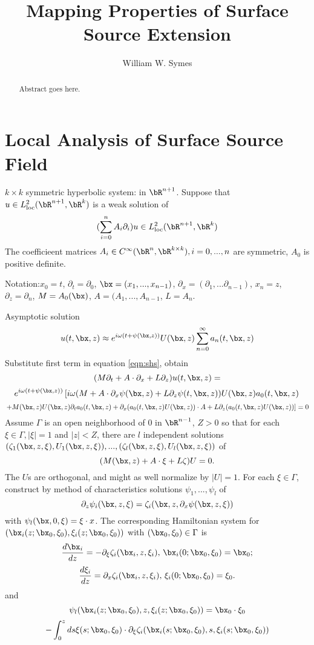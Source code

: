 \title{Mapping Properties of Surface Source Extension}
\author{William W. Symes}

\begin{abstract}
  Abstract goes here.
\end{abstract}

\section{Local Analysis of Surface Source Field}
$k \times  k$ symmetric hyperbolic system: in $\bR^{n+1}$. Suppose that $u \in L^2_{\rm loc}(\bR^{n+1},\bR^k)$ is a weak solution of
\begin{equation}
  \label{eqn:shs}
  (\sum_{i=0}^n A_i\partial_i ) u \in L^2_{\rm loc}(\bR^{n+1},\bR^k)
\end{equation}
The coefficieent matrices $A_i \in C^{\infty}(\bR^n, \bR^{k \times
  k}), i=0,...,n$ are symmetric, $A_0$ is positive definite.

Notation:$x_0=t$, $\partial_t=\partial_0$, $\bx = (x_1,...,x_{n-1})$,
$\partial_x=(\partial_1,...\partial_{n-1})$, $x_n=z$, $\partial_z =
\partial_{n}$, $M=A_0(\bx)$, $A = (A_1,...,A_{n-1}$, $L=A_{n}$.

Asymptotic solution 
\[
u(t,\bx,z) \approx e^{i\omega(t + \psi(\bx,z))} U(\bx,z)\sum_{n=0}^{\infty}
a_n(t,\bx,z)
\]
Substitute first term in equation \ref{eqn:shs}, obtain
\[
(M\partial_t + A\cdot \partial_x + L \partial_z)u(t,\bx,z) =
\]
\[
 e^{i\omega(t + \psi(\bx,z))}\left[ i\omega (M + A
\cdot \partial_x \psi(\bx,z) + L \partial_z
\psi(t,\bx,z))U(\bx,z)a_0(t,\bx,z) \right.
\]
\[
\left. + M(\bx,z) U(\bx,z) \partial_t a_0(t,\bx,z) + \partial_x
(a_0(t,\bx,z) U(\bx,z))\cdot A + L\partial_z (a_0(t,\bx,z)U(\bx,z))\right]= 0
\]
Assume $\Gamma$ is an open neighborhood of $0$ in $\bR^{n-1}$, $Z>0$ so that for each
$\xi \in \Gamma, |\xi|=1$ and $|z| < Z$, there are $l$ independent
solutions
$(\zeta_1(\bx,z,\xi),U_1(\bx,z,\xi)),...,(\zeta_l(\bx,z,\xi), U_l(\bx,z,\xi))$ of
\[
 (M(\bx,z) + A\cdot \xi + L \zeta) U=0.
\]
The $U$s are orthogonal, and might as well normalize by
$|U|=1$. For each $\xi \in \Gamma$, construct by method of characteristics solutions
$\psi_1,...,\psi_l$ of 
\[
\partial_z \psi_i(\bx,z,\xi) = \zeta_i(\bx,z,\partial_x\psi(\bx,z,\xi))
\]
with $\psi_l(\bx,0,\xi) =\xi \cdot x$. The corresponding Hamiltonian
system for $(\bx_i(z;\bx_0,\xi_0),\xi_i(z;\bx_0,\xi_0))$ with
$(\bx_0,\xi_0) \in \Gamma$ is
\begin{equation}
  \label{eqn:zetahe1}
  \frac{d\bx_i}{dz} = - \partial_{\xi}\zeta_i(\bx_i,z,\xi_i),\,
  \bx_i(0;\bx_0,\xi_0) = \bx_0;
\end{equation}
\begin{equation}
  \label{eqn:zetahe2}
  \frac{d\xi_i}{dz}
  = \partial_x\zeta_i(\bx_i,z,\xi_i),\, \xi_i(0;\bx_0,\xi_0) = \xi_0.
\end{equation}
and
\[
  \psi_l(\bx_i(z;\bx_0,\xi_0),z,\xi_i(z;\bx_0,\xi_0))= \bx_0\cdot\xi_0
\]
\begin{equation}
  \label{eqn:psihe}
- \int_0^z ds \xi(s;\bx_0,\xi_0)\cdot \partial_{\xi}\zeta_i(\bx_i(s;\bx_0,\xi_0),s,\xi_i(s;\bx_0,\xi_0))
\end{equation}



